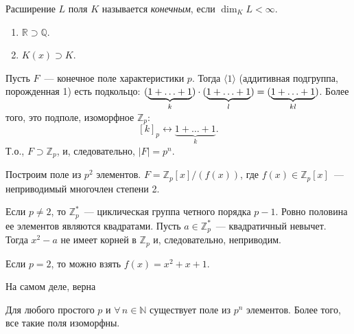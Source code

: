 \documentclass[a4paper]{article}
\newcommand*{\p}[1]{#1\nobreak\discretionary{}{\hbox{$\mathsurround=0pt #1$}}{}}
\begin{document}
Расширение $L$ поля $K$ называется \emph{конечным}, если
$\dim_KL<\infty$.

\prim
\begin{enumerate}
  \item $\mathbb{R}\supset \mathbb{Q}$.
  \item $K(x)\supset K$.
\end{enumerate}

Пусть $F$~--- конечное поле характеристики $p$. Тогда
$\langle1\rangle$ (аддитивная подгруппа, порожденная 1) есть
подкольцо:
$(\underbrace{1+\ldots+1}_{k})\cdot(\underbrace{1+\ldots+1}_{l})\p=(\underbrace{1+\ldots+1}_{kl})$.
Более того, это подполе, изоморфное $\mathbb{Z}_p$:
$$[k]_p\leftrightarrow \underbrace{1+\ldots+1}_{k}.$$ Т.о., $F\supset
\mathbb{Z}_p$, и, следовательно, $|F|=p^n$.

Построим поле из $p^2$ элементов. $F=\mathbb{Z}_p[x]/(f(x))$, где
$f(x)\in\mathbb{Z}_p[x]$~--- неприводимый многочлен степени 2.

Если $p\neq2$, то $\mathbb{Z}_p^*$~--- циклическая группа четного
порядка $p-1$. Ровно половина ее элементов являются квадратами.
Пусть $a\in \mathbb{Z}_p^*$~--- квадратичный невычет. Тогда $x^2-a$
не имеет корней в $\mathbb{Z}_p$ и, следовательно, неприводим.

Если $p=2$, то можно взять $f(x)=x^2+x+1$.

На самом деле, верна

\begin{theorem}
Для любого простого $p$ и $\forall \, n\in \mathbb{N}$ существует
поле из $p^n$ элементов. Более того, все такие поля изоморфны.
\end{theorem}
\end{document}
